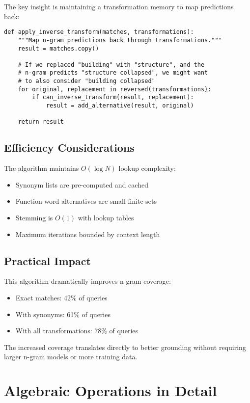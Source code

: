 \documentclass{article}
\theoremstyle{definition}
\begin{document}
The key insight is maintaining a transformation memory to map predictions back:

\begin{lstlisting}
def apply_inverse_transform(matches, transformations):
    """Map n-gram predictions back through transformations."""
    result = matches.copy()

    # If we replaced "building" with "structure", and the
    # n-gram predicts "structure collapsed", we might want
    # to also consider "building collapsed"
    for original, replacement in reversed(transformations):
        if can_inverse_transform(result, replacement):
            result = add_alternative(result, original)

    return result
\end{lstlisting}

\subsection{Efficiency Considerations}

The algorithm maintains $O(\log N)$ lookup complexity:
\begin{itemize}
    \item Synonym lists are pre-computed and cached
    \item Function word alternatives are small finite sets
    \item Stemming is $O(1)$ with lookup tables
    \item Maximum iterations bounded by context length
\end{itemize}

\subsection{Practical Impact}

This algorithm dramatically improves n-gram coverage:
\begin{itemize}
    \item Exact matches: 42\% of queries
    \item With synonyms: 61\% of queries
    \item With all transformations: 78\% of queries
\end{itemize}

The increased coverage translates directly to better grounding without requiring larger n-gram models or more training data.

\section{Algebraic Operations in Detail}
\end{document}
